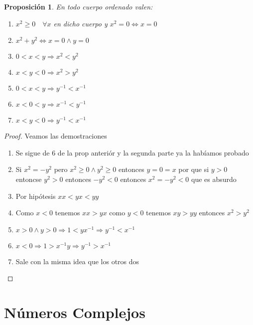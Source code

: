 \documentclass{article}
\theoremstyle{break}
\newtheorem{proposition}{Proposición}
\begin{document}
        \begin{proposition}
            En todo cuerpo ordenado valen:
            \begin{enumerate}
                \item $x^2 \geq 0 \quad \forall x$ en dicho cuerpo y $x^2 = 0 \iff x=0$
                \item $x^2 + y^2 \iff x=0 \land y=0$
                \item $0<x<y \Rightarrow x^2<y^2$
                \item $x<y<0 \Rightarrow x^2>y^2$
                \item $0<x<y\Rightarrow y^{-1} < x^{-1}$
                \item $x<0<y \Rightarrow x^{-1} < y^{-1}$
                \item $x<y<0 \Rightarrow y^{-1} < x^{-1}$
            \end{enumerate}
        \end{proposition}
        \begin{proof}
            Veamos las demostraciones
            \begin{enumerate}
                \item Se sigue de 6 de la prop anteriór y la segunda parte ya la habíamos probado
                \item Si $x^2 = -y^2$ pero $x^2\geq  0 \land y^2 \geq 0$ entonces $y=0=x$ por que si $y>0$
                entoncse $y^2 > 0$ entonces $-y^2 <0$ entonces $x^2 = -y^2 <0$ que es absurdo
                \item Por hipótesis $xx < yx < yy$
                \item Como $x<0 $ tenemos $xx>yx$ como $y<0$ tenemos $xy> yy$ entonces $x^2 >y^2$
                \item $x>0 \land y>0 \Rightarrow 1 < yx^{-1} \Rightarrow y^{-1} < x^{-1}$
                \item $x<0 \Rightarrow 1 > x^{-1}y \Rightarrow y^{-1} > x^{-1}$
                \item Sale con la misma idea que los otros dos 
            \end{enumerate}
        \end{proof}

        \section{Números Complejos}

    
\end{document}
